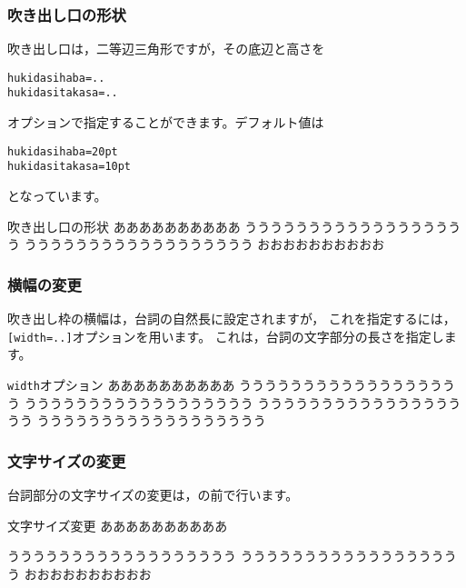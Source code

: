 \subsubsection{吹き出し口の形状}
吹き出し口は，二等辺三角形ですが，その底辺と高さを
\begin{jquote}
\begin{verbatim}
hukidasihaba=..
hukidasitakasa=..
\end{verbatim}
\end{jquote}
オプションで指定することができます。デフォルト値は
\begin{jquote}
\begin{verbatim}
hukidasihaba=20pt
hukidasitakasa=10pt
\end{verbatim}
\end{jquote}
となっています。

\begin{showEx}{吹き出し口の形状}
ああああああああああ%
%
うううううううううううううううううう
うううううううううううううううううう
おおおおおおおおおお
\end{showEx}

\subsubsection{横幅の変更}
吹き出し枠の横幅は，台詞の自然長に設定されますが，
これを指定するには，\verb+[width=..]+オプションを用います。
これは，台詞の文字部分の長さを指定します。

\begin{showEx}{\texttt{width}オプション}
ああああああああああ%
%
うううううううううううううううううう
うううううううううううううううううう
うううううううううううううううううう
うううううううううううううううううう
\end{showEx}

\subsubsection{文字サイズの変更}
台詞部分の文字サイズの変更は，の前で行います。

\begin{showEx}{文字サイズ変更}
ああああああああああ%
\begin{footnotesize}
%
\end{footnotesize}%
うううううううううううううううううう
うううううううううううううううううう
おおおおおおおおおお
\end{showEx}

